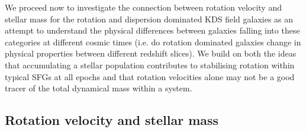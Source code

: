 \documentclass[fleqn,usenatbib]{mn2e}
\begin{document}
We proceed now to investigate the connection between rotation velocity and stellar mass for the rotation and dispersion dominated KDS field galaxies as an attempt to understand the physical differences between galaxies falling into these categories at different cosmic times (i.e. do rotation dominated galaxies change in physical properties between different redshift slices).
We build on both the ideas that accumulating a stellar population contributes to stabilising rotation within typical SFGs at all epochs and that rotation velocities alone may not be a good tracer of the total dynamical mass within a system. 

\subsection{Rotation velocity and stellar mass}\label{subsec:TF}
\end{document}
